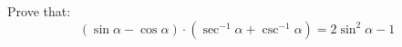 \documentclass{article}
\begin{document}
	
	Prove that:
	\[
	(\sin \alpha - \cos \alpha) \cdot (\sec^{-1} \alpha + \csc^{-1} \alpha) = 2 \sin^2 \alpha - 1
	\]
	
\end{document}
